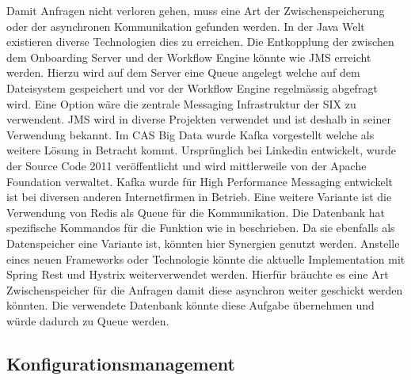Damit Anfragen nicht verloren gehen, muss eine Art der Zwischenspeicherung oder der asynchronen Kommunikation gefunden werden. In der Java Welt existieren diverse Technologien dies zu erreichen.\newline
Die Entkopplung der zwischen dem Onboarding Server und der Workflow Engine könnte wie JMS erreicht werden. Hierzu wird auf dem Server eine Queue angelegt welche auf dem Dateisystem gespeichert und vor der Workflow Engine regelmässig abgefragt wird. Eine Option wäre die zentrale Messaging Infrastruktur der SIX zu verwendent. JMS wird in diverse Projekten verwendet und ist deshalb in seiner Verwendung bekannt.\newline
Im CAS Big Data wurde Kafka vorgestellt welche als weitere Lösung in Betracht kommt. Ursprünglich bei Linkedin entwickelt, wurde der Source Code 2011 veröffentlicht und wird mittlerweile von der Apache Foundation verwaltet. Kafka wurde für High Performance Messaging entwickelt ist bei diversen anderen Internetfirmen in Betrieb.\newline
Eine weitere Variante ist die Verwendung von Redis als Queue für die Kommunikation. Die Datenbank hat spezifische Kommandos für die Funktion wie in \cite{redisqueue} beschrieben. Da sie ebenfalls als Datenspeicher eine Variante ist, könnten hier Synergien genutzt werden.\newline
Anstelle eines neuen Frameworks oder Technologie könnte die aktuelle Implementation mit Spring Rest und Hystrix weiterverwendet werden. Hierfür bräuchte es eine Art Zwischenspeicher für die Anfragen damit diese asynchron weiter geschickt werden könnten. Die verwendete Datenbank könnte diese Aufgabe übernehmen und würde dadurch zu Queue werden.

\subsection{Konfigurationsmanagement}


